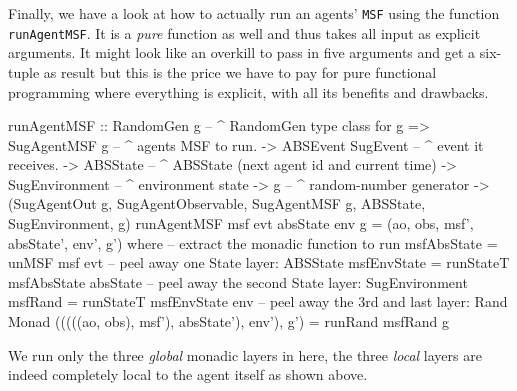 Finally, we have a look at how to actually run an agents' \texttt{MSF} using the function \texttt{runAgentMSF}. It is a \textit{pure} function as well and thus takes all input as explicit arguments. It might look like an overkill to pass in five arguments and get a six-tuple as result but this is the price we have to pay for pure functional programming where everything is explicit, with all its benefits and drawbacks.

\begin{HaskellCode}
runAgentMSF :: RandomGen g        -- ^ RandomGen type class for g
            => SugAgentMSF g      -- ^ agents MSF to run.
            -> ABSEvent SugEvent  -- ^ event it receives.
            -> ABSState           -- ^ ABSState (next agent id and current time)
            -> SugEnvironment     -- ^ environment state
            -> g                  -- ^ random-number generator
            -> (SugAgentOut g, SugAgentObservable, SugAgentMSF g, 
                ABSState, SugEnvironment, g)
runAgentMSF msf evt absState env g = (ao, obs, msf', absState', env', g') 
  where
    -- extract the monadic function to run
    msfAbsState = unMSF msf evt
    -- peel away one State layer: ABSState
    msfEnvState = runStateT msfAbsState absState
    -- peel away the second State layer: SugEnvironment
    msfRand = runStateT msfEnvState env
    -- peel away the 3rd and last layer: Rand Monad
    (((((ao, obs), msf'), absState'), env'), g') = runRand msfRand g
\end{HaskellCode}

We run only the three \textit{global} monadic layers in here, the three \textit{local} layers are indeed completely local to the agent itself as shown above.